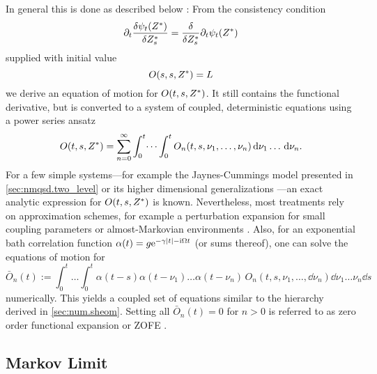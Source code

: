 In general this is done as described below \cite{DiGiSt98_nmqsd}:
From the consistency condition
\begin{equation}
  \partial_t \frac{\delta \psi_t({Z}^*)}{\delta {Z}^*_s} = \frac{\delta}{\delta {Z}^*_s} \partial_t \psi_t({Z}^*)
  \label{eq:nmqsd.consistency_condition}
\end{equation}
supplied with initial value
\begin{equation}
  O(s, s, {Z}^*) = L
  \label{eq:nmqsd.o_initial}
\end{equation}
we derive an equation of motion for $O(t, s, {Z}^*)$.
It still contains the functional derivative, but is converted to a system of coupled, deterministic equations using a power series ansatz
\begin{equation}
  O(t, s, {Z}^*) = \sum_{n=0}^\infty \int_0^t \dots \int_0^t O_n(t, s, \nu_1, \dots, \nu_n) \, \mathrm{d} \nu_1 \dots \, \mathrm{d}\nu_n.
  \label{eq:nmqsd.o_series}
\end{equation}
For a few simple systems---for example the Jaynes-Cummings model presented in \autoref{sec:nmqsd.two_level} or its higher dimensional generalizations \cite{JiZhYo12_exact_nmqsd}---an exact analytic expression for $O(t, s, {Z}^*)$ is known.
Nevertheless, most treatments rely on approximation schemes, for example a perturbation expansion for small coupling parameters or almost-Markovian environments \cite{YuDiGiSt99_pertubation}.
Also, for an exponential bath correlation function $\alpha(t) = g \exp[-\gamma\abs{t} - \ii\Omega t ]$ (or sums thereof), one can solve the equations of motion for
\begin{equation*}
  \bar O_n(t) := \int_0^t \dots \int_0^t \alpha(t-s) \alpha(t - \nu_1) \ldots \alpha(t - \nu_n) \, O_n(t, s, \nu_1, \dots, \dd\nu_n) \dd \nu_1 \dots \nu_n \dd s
\end{equation*}
numerically.
This yields a coupled set of equations similar to the hierarchy derived in \autoref{sec:num.sheom}.
Setting all $\bar O_n(t) = 0$ for $n > 0$ is referred to as zero order functional expansion or \textsc{ZOFE} \cite{RiRoSt11_fmo,RoStEi11_nmqsd_aggregats}.


\subsection{Markov Limit}
\label{sub:nmqsd.markov}
%


